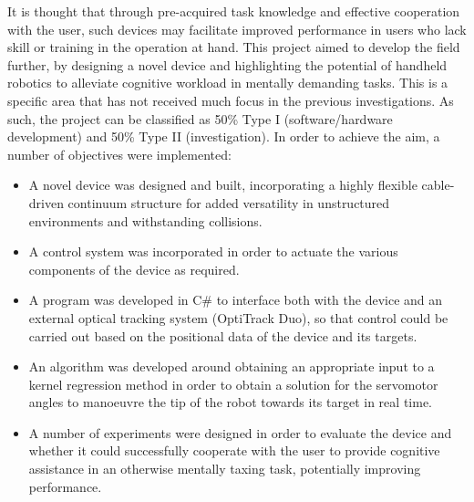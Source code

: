 \documentclass[11pt]{article}
\begin{document}
It is thought that through pre-acquired task knowledge and effective cooperation with the user, such devices may facilitate improved performance in users who lack skill or training in the operation at hand. This project aimed to develop the field further, by designing a novel device and highlighting the potential of handheld robotics to alleviate cognitive workload in mentally demanding tasks. This is a specific area that has not received much focus in the previous investigations. As such, the project can be classified as 50\% Type I (software/hardware development) and 50\% Type II (investigation). In order to achieve the aim, a number of objectives were implemented:
\begin{itemize}
\item{A novel device was designed and built, incorporating a highly flexible cable-driven continuum structure for added versatility in unstructured environments and withstanding collisions.}
\item{A control system was incorporated in order to actuate the various components of the device as required.}
\item{A program was developed in C\# to interface both with the device and an external optical tracking system (OptiTrack Duo), so that control could be carried out based on the positional data of the device and its targets.}
\item{An algorithm was developed around obtaining an appropriate input to a kernel regression method in order to obtain a solution for the servomotor angles to manoeuvre the tip of the robot towards its target in real time.}
\item{A number of experiments were designed in order to evaluate the device and whether it could successfully cooperate with the user to provide cognitive assistance in an otherwise mentally taxing task, potentially improving performance.}
\end{itemize}  
\end{document}
